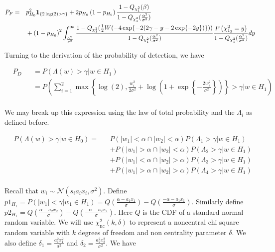 \documentclass[english]{article}
\begin{document}
\begin{equation}
\begin{aligned}
&P_F =
&& p_{H_0}^2\mathbf 1_{\{2\log(2)>\gamma\}} + 2p_{H_0}\left(1-p_{H_0}\right)\frac{1-Q_{\chi_1^2}(\beta)}{1-Q_{\chi_1^2}(\frac{\alpha^2}{\sigma^2})}\\
&&&+\left(1-p_{H_0}\right)^2\int_{\frac{\alpha^2}{\sigma^2}}^\infty\frac{1-Q_{\chi_1^2}(\frac{1}{2}W(-4\exp\{-2(2\gamma-y-2\exp\{-2y\})\}))}{1-Q_{\chi_1^2}(\frac{\alpha^2}{\sigma^2})}\frac{P\left(\chi_{1_2}^2=y\right)}{1-Q_{\chi_1^2}(\frac{\alpha^2}{\sigma^2})}dy\\
\end{aligned}
\end{equation}

Turning to the derivation of the probability of detection, we have

\begin{equation}
\begin{aligned}
&P_D
&&= P(\Lambda(w)>\gamma|w\in H_1)\\
&&&=P\left(\sum_{i=1}^2\max\left\{\log\left(2\right), \frac{w_i^2}{2\sigma^2}+\log\left(1 + \exp\left\{-\frac{2w_i^2}{\sigma^2}\right\}\right)\right\} > \gamma |w\in H_1\right)\\
\end{aligned}
\end{equation}

We may break up this expression using the law of total probability and the $\Lambda_i$ as defined before.

\begin{equation}
\begin{aligned}
&P(\Lambda(w)>\gamma|w\in H_0) =
&&P(|w_1|<\alpha \cap |w_2| <\alpha)P(\Lambda_1 >\gamma|w\in H_1) \\
&&&+P(|w_1|>\alpha \cap |w_2| <\alpha)P(\Lambda_2 >\gamma|w\in H_1) \\
&&&+P(|w_1|<\alpha \cap |w_2| >\alpha)P(\Lambda_3 >\gamma|w\in H_1) \\
&&&+P(|w_1|>\alpha \cap |w_2| >\alpha)P(\Lambda_4 >\gamma|w\in H_1) \\
\end{aligned}
\end{equation}

Recall that $w_i\sim\mathcal{N}(s_ia_ix_i,\sigma^2)$. Define $p1_{H_1} = P(|w_1| < \gamma |w_1\in H_1) = Q\left(\frac{\alpha-a_1x_1}{\sigma}\right) - Q\left(\frac{-\alpha-a_1x_1}{\sigma}\right)$. Similarly define $p2_{H_1} = Q\left(\frac{\alpha-a_2x_2}{\sigma}\right) - Q\left(\frac{-\alpha-a_2x_2}{\sigma}\right)$. Here $Q$ is the CDF of a standard normal random variable. We will use $\chi^2_{\text{nc}}\left(k,\delta\right)$ to represent a noncentral chi square random variable with $k$ degrees of freedom and non centrality parameter $\delta$. We also define $\delta_1 = \frac{a_1^2x_1^2}{\sigma^2}$ and $\delta_2=\frac{a_2^2x_2^2}{\sigma^2}$. We have
\end{document}
